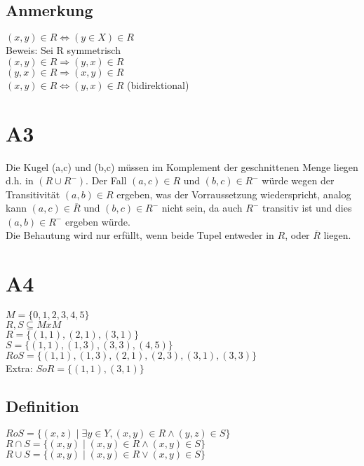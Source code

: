 \documentclass[11pt]{scrartcl}
\begin{document}
\subsection{Anmerkung}
$(x,y) \in R \iff (y \in X) \in R$ \\
Beweis: Sei R symmetrisch \\
$(x,y) \in R \Rightarrow (y,x) \in R$ \\
$(y,x) \in R \Rightarrow (x,y) \in R$ \\
$(x,y) \in R \iff (y,x) \in R$ (bidirektional)

\section{A3}
Die Kugel (a,c) und (b,c) müssen im Komplement der geschnittenen Menge liegen d.h. in $(R \cup R^{-})$. Der Fall $(a,c) \in R$ und $(b,c) \in R^{-}$ würde wegen der Transitivität $(a,b) \in R$ ergeben, was der Vorraussetzung wiederspricht, analog kann $(a,c) \in \overline{R}$ und $(b,c) \in R^{-}$ nicht sein, da auch $R^{-}$ transitiv ist und dies $(a,b) \in R^{-}$ ergeben würde. \\
Die Behautung wird nur erfüllt, wenn beide Tupel entweder in $R$, oder $\overline{R}$ liegen.

\section{A4}
$M = \{0,1,2,3,4,5\}$ \\
$R,S \subseteq MxM$ \\
$R = \{(1,1),(2,1),(3,1) \}$ \\
$S = \{(1,1),(1,3),(3,3),(4,5) \}$ \\
$RoS = \{ (1,1),(1,3),(2,1),(2,3),(3,1),(3,3) \} $ \\
Extra: $SoR = \{(1,1),(3,1) \}$ \\

\subsection*{Definition}
$RoS = \{ (x,z) \mid \exists y \in Y, (x,y) \in R \land (y,z) \in S\}$ \\
$R \cap S = \{ (x,y) \mid (x,y) \in R \land (x,y) \in S \}$ \\
$R \cup S = \{ (x,y) \mid (x,y) \in R \lor (x,y) \in S \}$
\end{document}
